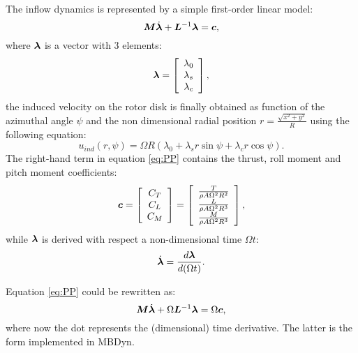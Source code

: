 The inflow dynamics is represented by a simple first-order linear model: 
\begin{equation}\label{eq:PP}
\bm{M} \dot{\bm{\lambda}} + \bm{L}^{-1} \bm{\lambda} =
 \bm{c},
\end{equation}
where $\bm{\lambda}$ is a vector with 3 elements:
\begin{equation}
\bm{\lambda} = 
\left[ 
\begin{array}{c}
\lambda_0 \\
\lambda_s \\
\lambda_c
\end{array}
\right],
\end{equation}
the induced velocity on the rotor disk is finally obtained as 
function of the azimuthal angle $\psi$ and the non dimensional
radial position $r = \frac{\sqrt{x^2 + y^2}}{R}$ using the
following equation:
\begin{equation}
u_{ind}(r, \psi) = \Omega R ( \lambda_0 + \lambda_s r \sin{\psi} +
\lambda_c r \cos{\psi} ).
\end{equation}
The right-hand term in equation \ref{eq:PP} contains the thrust,
roll moment and pitch moment coefficients:
\begin{equation}
\bm{c} = \left[
\begin{array}{c}
C_T \\
C_L \\
C_M 
\end{array}
\right] = \left[
\begin{array}{c}
\frac{T}{\rho A \Omega^2 R^2} \\
\frac{L}{\rho A \Omega^2 R^3} \\
\frac{M}{\rho A \Omega^2 R^3} 
\end{array}
\right],
\end{equation}
while $\bm{\lambda}$ is derived with respect a non-dimensional
time $\Omega t$:
\begin{equation}
\dot{\bm{\lambda}} = \frac{ d \bm{\lambda}}{ d (\Omega t)}.
\end{equation}

Equation \ref{eq:PP} could be rewritten as:
\begin{equation}
\bm{M} \dot{\bm{\lambda}} + \Omega \bm{L}^{-1} \bm{\lambda} =
\Omega \bm{c},
\end{equation}
where now the dot represents the (dimensional) time derivative. The latter is the 
form implemented in MBDyn.

